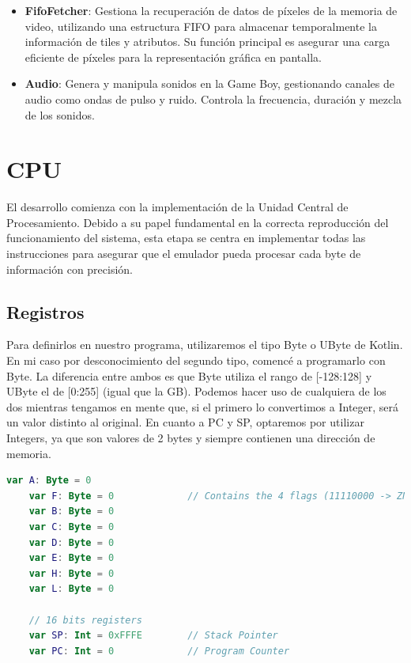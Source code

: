 \begin{itemize}
    \item \textbf{FifoFetcher}: Gestiona la recuperación de datos de píxeles de la memoria de video, utilizando una estructura FIFO para almacenar temporalmente la información de tiles y atributos. Su función principal es asegurar una carga eficiente de píxeles para la representación gráfica en pantalla.
    \item \textbf{Audio}: Genera y manipula sonidos en la Game Boy, gestionando canales de audio como ondas de pulso y ruido. Controla la frecuencia, duración y mezcla de los sonidos.
\end{itemize}

\section{CPU}

El desarrollo comienza con la implementación de la Unidad Central de Procesamiento. Debido a su papel fundamental en la correcta reproducción del funcionamiento del sistema, esta etapa se centra en implementar todas las instrucciones para asegurar que el emulador pueda procesar cada byte de información con precisión.

\subsection{Registros}
Para definirlos en nuestro programa, utilizaremos el tipo Byte o UByte de Kotlin. En mi caso por desconocimiento del segundo tipo, comencé a programarlo con Byte. La diferencia entre ambos es que Byte utiliza el rango de [-128:128] y UByte el de [0:255] (igual que la GB). Podemos hacer uso de cualquiera de los dos mientras tengamos en mente que, si el primero lo convertimos a Integer, será un valor distinto al original. En cuanto a PC y SP, optaremos por utilizar Integers, ya que son valores de 2 bytes y siempre contienen una dirección de memoria.

\begin{lstlisting}[language=Kotlin, caption={Declaración de Registros}, label={code:kotlinregistros}]
    var A: Byte = 0
    var F: Byte = 0             // Contains the 4 flags (11110000 -> ZNHC0000)
    var B: Byte = 0
    var C: Byte = 0
    var D: Byte = 0
    var E: Byte = 0
    var H: Byte = 0
    var L: Byte = 0

    // 16 bits registers
    var SP: Int = 0xFFFE        // Stack Pointer
    var PC: Int = 0             // Program Counter
\end{lstlisting}

